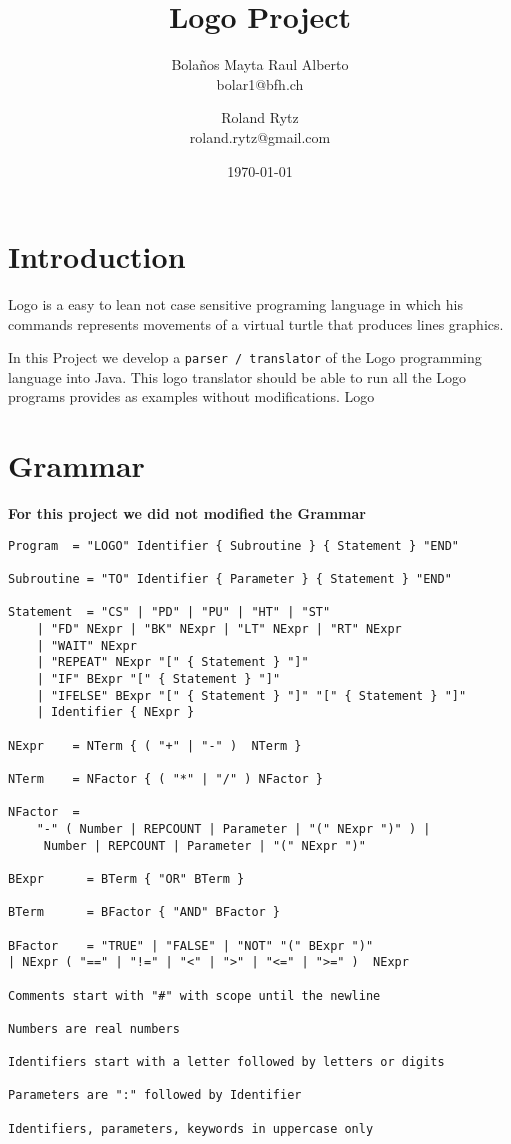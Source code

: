\documentclass[a4paper, 12pt, parskip=full*]{scrreprt}
\title{Logo Project}
\author{
    Bolaños Mayta Raul Alberto \\ bolar1@bfh.ch\and
    Roland Rytz \\ roland.rytz@gmail.com
}
\date{\today}
\begin{document}
\maketitle

\tableofcontents

\chapter{Introduction} 
Logo is a easy to lean not case sensitive programing language in which his commands represents movements of a virtual turtle that  produces lines graphics.

In this Project we develop a \texttt{parser / translator} of the Logo programming language into Java. 
This logo translator should be able to run all the Logo programs provides as examples without modifications. 
Logo 

\chapter{Grammar}
\textbf{For this project we did not modified the Grammar}\\

\begin{lstlisting}[frame=single]
Program  = "LOGO" Identifier { Subroutine } { Statement } "END"

Subroutine = "TO" Identifier { Parameter } { Statement } "END"

Statement  = "CS" | "PD" | "PU" | "HT" | "ST" 
    | "FD" NExpr | "BK" NExpr | "LT" NExpr | "RT" NExpr 
    | "WAIT" NExpr 
    | "REPEAT" NExpr "[" { Statement } "]"
    | "IF" BExpr "[" { Statement } "]"
    | "IFELSE" BExpr "[" { Statement } "]" "[" { Statement } "]"
    | Identifier { NExpr } 
      
NExpr    = NTerm { ( "+" | "-" )  NTerm }

NTerm    = NFactor { ( "*" | "/" ) NFactor }

NFactor  = 
    "-" ( Number | REPCOUNT | Parameter | "(" NExpr ")" ) | 
	 Number | REPCOUNT | Parameter | "(" NExpr ")" 

BExpr      = BTerm { "OR" BTerm }

BTerm      = BFactor { "AND" BFactor }

BFactor    = "TRUE" | "FALSE" | "NOT" "(" BExpr ")" 
| NExpr ( "==" | "!=" | "<" | ">" | "<=" | ">=" )  NExpr 

Comments start with "#" with scope until the newline

Numbers are real numbers

Identifiers start with a letter followed by letters or digits

Parameters are ":" followed by Identifier

Identifiers, parameters, keywords in uppercase only
\end{lstlisting}
\end{document}
